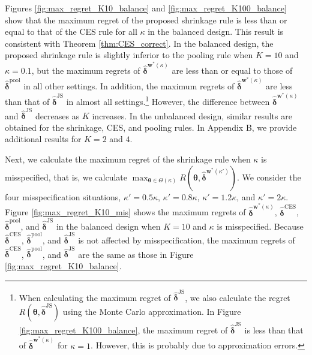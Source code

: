 \documentclass[12pt,a4paper]{article}
\begin{document}
Figures \ref{fig:max_regret_K10_balance} and \ref{fig:max_regret_K100_balance} show that the maximum regret of the proposed shrinkage rule is less than or equal to that of the CES rule for all $\kappa$ in the balanced design. This result is consistent with Theorem \ref{thm:CES_correct}. In the balanced design, the proposed shrinkage rule is slightly inferior to the pooling rule when $K=10$ and $\kappa = 0.1$, but the maximum regrets of $\hat{\bm{\delta}}^{\bm{w}^{\ast}(\kappa)}$ are less than or equal to those of $\hat{\bm{\delta}}^{\mathrm{pool}}$ in all other settings. In addition, the maximum regrets of $\hat{\bm{\delta}}^{\bm{w}^{\ast}(\kappa)}$ are less than that of $\hat{\bm{\delta}}^{\mathrm{JS}}$ in almost all settings.\footnote{When calculating the maximum regret of $\hat{\bm{\delta}}^{\mathrm{JS}}$, we also calculate the regret $R(\bm{\theta},\hat{\bm{\delta}}^{\mathrm{JS}})$ using the Monte Carlo approximation. In Figure \ref{fig:max_regret_K100_balance}, the maximum regret of $\hat{\bm{\delta}}^{\mathrm{JS}}$ is less than that of $\hat{\bm{\delta}}^{\bm{w}^{\ast}(\kappa)}$ for $\kappa = 1$. However, this is probably due to approximation errors.} However, the difference between $\hat{\bm{\delta}}^{\bm{w}^{\ast}(\kappa)}$ and $\hat{\bm{\delta}}^{\mathrm{JS}}$ decreases as $K$ increases. In the unbalanced design, similar results are obtained for the shrinkage, CES, and pooling rules. In Appendix B, we provide additional results for $K=2$ and $4$.

Next, we calculate the maximum regret of the shrinkage rule when $\kappa$ is misspecified, that is, we calculate $\max_{\bm{\theta} \in \Theta(\kappa)} R(\bm{\theta},\hat{\bm{\delta}}^{\bm{w}^{\ast}(\kappa')})$. We consider the four misspecification situations, $\kappa' = 0.5 \kappa$, $\kappa' = 0.8 \kappa$, $\kappa' = 1.2 \kappa$, and $\kappa' = 2 \kappa$. Figure \ref{fig:max_regret_K10_mis} shows the maximum regrets of $\hat{\bm{\delta}}^{\bm{w}^{\ast}(\kappa)}$, $\hat{\bm{\delta}}^{\mathrm{CES}}$, $\hat{\bm{\delta}}^{\mathrm{pool}}$, and $\hat{\bm{\delta}}^{\mathrm{JS}}$ in the balanced design when $K=10$ and $\kappa$ is misspecified. Because $\hat{\bm{\delta}}^{\mathrm{CES}}$, $\hat{\bm{\delta}}^{\mathrm{pool}}$, and $\hat{\bm{\delta}}^{\mathrm{JS}}$ is not affected by misspecification, the maximum regrets of $\hat{\bm{\delta}}^{\mathrm{CES}}$, $\hat{\bm{\delta}}^{\mathrm{pool}}$, and $\hat{\bm{\delta}}^{\mathrm{JS}}$ are the same as those in Figure \ref{fig:max_regret_K10_balance}.
\end{document}
